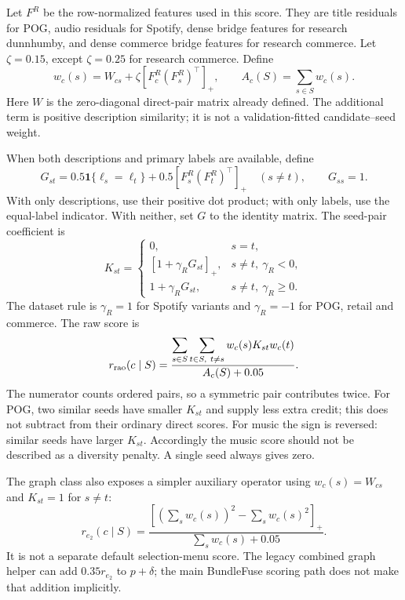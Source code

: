 \documentclass[11pt,a4paper]{article}
\newcommand{\pos}[1]{\left[#1\right]_{+}}
\newcommand{\ind}{\mathbf 1}
\begin{document}
Let $F^R$ be the row-normalized features used in this score. They are title
residuals for POG, audio residuals for Spotify, dense bridge features for
research dunnhumby, and dense commerce bridge features for research commerce.
Let $\zeta=0.15$, except $\zeta=0.25$ for research commerce. Define
\begin{equation}
 w_c(s)=W_{cs}+\zeta\pos{F^R_c(F^R_s)^\top},\qquad
 A_c(S)=\sum_{s\in S}w_c(s).
\end{equation}
Here $W$ is the zero-diagonal direct-pair matrix already defined. The additional
term is positive description similarity; it is not a validation-fitted
candidate--seed weight.

When both descriptions and primary labels are available, define
\[
 G_{st}=0.5\ind\{\ell_s=\ell_t\}
       +0.5\pos{F^R_s(F^R_t)^\top}\quad(s\ne t),\qquad G_{ss}=1.
\]
With only descriptions, use their positive dot product; with only labels, use
the equal-label indicator. With neither, set $G$ to the identity matrix.
The seed-pair coefficient is
\begin{equation}
 K_{st}=\begin{cases}
 0,&s=t,\\
 [1+\gamma_R G_{st}]_+,&s\ne t,\ \gamma_R<0,\\
 1+\gamma_R G_{st},&s\ne t,\ \gamma_R\ge0.
 \end{cases}
\end{equation}
The dataset rule is $\gamma_R=1$ for Spotify variants and $\gamma_R=-1$ for
POG, retail and commerce. The raw score is
\begin{equation}
 r_{\rm rao}(c\mid S)=
 \frac{\displaystyle\sum_{s\in S}\sum_{t\in S,\ t\ne s}
 w_c(s)K_{st}w_c(t)}{A_c(S)+0.05}.
\end{equation}
The numerator counts ordered pairs, so a symmetric pair contributes twice.
For POG, two similar seeds have smaller $K_{st}$ and supply less extra
credit; this does not subtract from their ordinary direct scores.
For music the sign is reversed: similar seeds have larger $K_{st}$.
Accordingly the music score should not be described as a diversity penalty.
A single seed always gives zero.

The graph class also exposes a simpler auxiliary operator using $w_c(s)=W_{cs}$
and $K_{st}=1$ for $s\ne t$:
\begin{equation}
 r_{e_2}(c\mid S)=\frac{
 \left[\left(\sum_sw_c(s)\right)^2-\sum_sw_c(s)^2\right]_+}
 {\sum_sw_c(s)+0.05}.
\end{equation}
It is not a separate default selection-menu score. The legacy combined graph
helper can add $0.35r_{e_2}$ to $p+\delta$; the main BundleFuse scoring path
does not make that addition implicitly.
\end{document}
